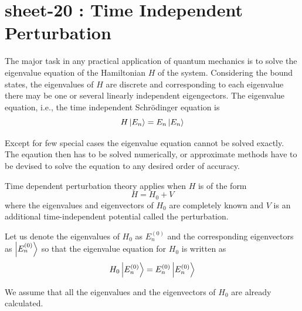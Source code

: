 %
%
%

\chapter{sheet-20 : Time Independent Perturbation}
\ifpdf
\graphicspath{{Chapter20/figs/}}
\else
\graphicspath{{Chapter20/figs/}}
\fi

The major task in any practical application of quantum mechanics is to solve the eigenvalue equation of the Hamiltonian $H$ of the system. Considering the bound states, the eigenvalues of $H$ are discrete and corresponding to each eigenvalue there may be one or several linearly independent eigengectors. The eigenvalue equation, i.e., the time independent Schr\"{o}dinger equation is 
\begin{equation}
	H \ket{E_n} = E_n \ket{E_n}
	\label{chapter20.eqn1-intro}
\end{equation}

Except for few special cases the eigenvalue equation cannot be solved exactly. The eqaution then has to be solved numerically, or approximate methods have to be devised to solve the equation to any desired order of accuracy.

Time dependent perturbation theory applies when $H$ is of the form
\begin{equation}
	H = H_0 + V
	\label{chapter20.eqn2-intro}
\end{equation}
where the eigenvalues and eigenvectors of $H_0$ are completely known and $V$ is an additional time-independent potential called the perturbation.


Let us denote the eigenvalues of $H_0$ as $E_n^{(0)}$ and the corresponding eigenvectors as $\ket{E_n^{(0)}}$  so that the eigenvalue equation for $H_0$ is written as
\begin{equation}
	H_0 \ket{E_n^{(0)}} = E_n^{(0)} \ket{E_n^{(0)}}
	\label{chapter20.eqn3-intro}
\end{equation}

We assume that all the eigenvalues and the eigenvectors of $H_0$ are already calculated.

